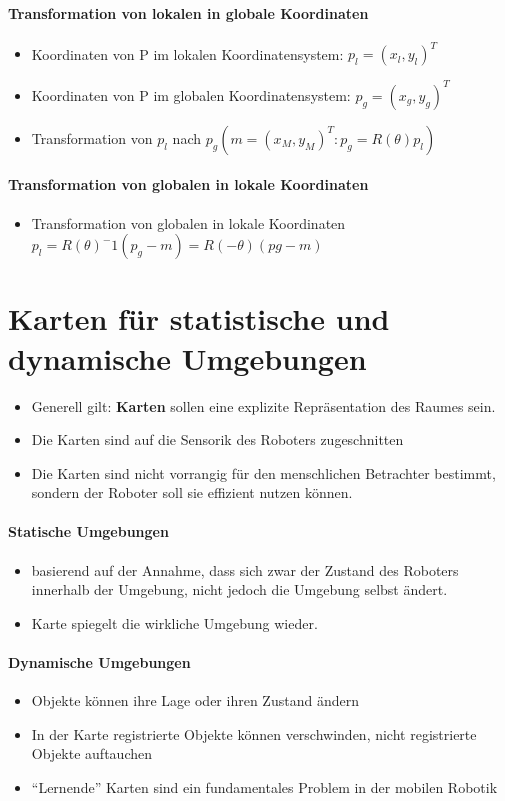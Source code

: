 \paragraph{Transformation von lokalen in globale Koordinaten}
\begin{itemize}
	\item Koordinaten von P im lokalen Koordinatensystem: $p_l=(x_l, y_l)^T$
	\item Koordinaten von P im globalen Koordinatensystem: $p_g = (x_g, y_g)^T$
	\item Transformation von $p_l$ nach $p_g(m=(x_M, y_M)^T: p_g=R(\theta)p_l)$
\end{itemize}
\paragraph{Transformation von globalen in lokale Koordinaten}
\begin{itemize}
	\item Transformation von globalen in lokale Koordinaten $p_l = R(\theta)^-1(p_g - m) = R(-\theta)(pg - m)$
\end{itemize}
\section{Karten für statistische und dynamische Umgebungen}
\begin{itemize}
	\item Generell gilt: \textbf{Karten} sollen eine explizite Repräsentation des Raumes sein.
	\item Die Karten sind auf die Sensorik des Roboters zugeschnitten
	\item Die Karten sind nicht vorrangig für den menschlichen Betrachter bestimmt, sondern der Roboter soll sie effizient nutzen können.
\end{itemize}
\paragraph{Statische Umgebungen}
\begin{itemize}
	\item basierend auf der Annahme, dass sich zwar der Zustand des Roboters innerhalb der Umgebung, nicht jedoch die Umgebung selbst ändert.
	\item Karte spiegelt die wirkliche Umgebung wieder.
\end{itemize}
\paragraph{Dynamische Umgebungen}
\begin{itemize}
	\item Objekte können ihre Lage oder ihren Zustand ändern
	\item In der Karte registrierte Objekte können verschwinden, nicht registrierte Objekte auftauchen
	\item \enquote{Lernende} Karten sind ein fundamentales Problem in der mobilen Robotik
\end{itemize}
